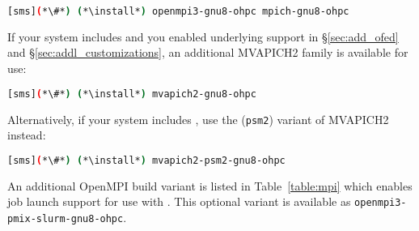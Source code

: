 \fi

\begin{lstlisting}[language=bash]
[sms](*\#*) (*\install*) openmpi3-gnu8-ohpc mpich-gnu8-ohpc
\end{lstlisting}

If your system includes \InfiniBand{} and you enabled underlying support in
\S\ref{sec:add_ofed} and \S\ref{sec:addl_customizations}, an additional
MVAPICH2 family is available for use:

\begin{lstlisting}[language=bash]
[sms](*\#*) (*\install*) mvapich2-gnu8-ohpc
\end{lstlisting}

Alternatively, if your system includes \IntelR{} \OmniPath{}, use the (\texttt{psm2})
variant of MVAPICH2 instead:

\begin{lstlisting}[language=bash]
[sms](*\#*) (*\install*) mvapich2-psm2-gnu8-ohpc
\end{lstlisting}

An additional OpenMPI build variant is listed in Table~\ref{table:mpi} which
enables \href{https://pmix.github.io/pmix/}{\color{blue}{PMIx}} job launch
support for use with \SLURM{}. This optional variant is
available as \texttt{openmpi3-pmix-slurm-gnu8-ohpc}.
